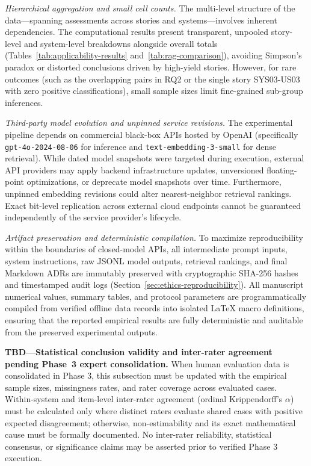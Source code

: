 \emph{Hierarchical aggregation and small cell counts.}
The multi-level structure of the data---spanning \StudyAssessmentCount{}
assessments across \StudyStoryCount{} stories and \StudySystemCount{} systems---involves
inherent dependencies. The computational results present transparent, unpooled
story-level and system-level breakdowns alongside overall totals
(Tables~\ref{tab:applicability-results} and~\ref{tab:rag-comparison}),
avoiding Simpson's paradox or distorted conclusions driven by high-yield stories.
However, for rare outcomes (such as the \StudyRagOverlapCount{} overlapping
pairs in RQ2 or the single story SYS03-US03 with zero positive classifications),
small sample sizes limit fine-grained sub-group inferences.

\emph{Third-party model evolution and unpinned service revisions.}
The experimental pipeline depends on commercial black-box APIs hosted by
OpenAI (specifically \texttt{gpt-4o-2024-08-06} for inference and
\texttt{text-embedding-3-small} for dense retrieval).
While dated model snapshots were targeted during execution, external API
providers may apply backend infrastructure updates, unversioned floating-point
optimizations, or deprecate model snapshots over time.
Furthermore, unpinned embedding revisions could alter nearest-neighbor
retrieval rankings. Exact bit-level replication across external cloud
endpoints cannot be guaranteed independently of the service provider's lifecycle.

\emph{Artifact preservation and deterministic compilation.}
To maximize reproducibility within the boundaries of closed-model APIs, all
intermediate prompt inputs, system instructions, raw JSONL model outputs,
retrieval rankings, and final Markdown ADRs are immutably preserved with
cryptographic SHA-256 hashes and timestamped audit logs (Section~\ref{sec:ethics-reproducibility}).
All manuscript numerical values, summary tables, and protocol parameters
are programmatically compiled from verified offline data records into isolated
LaTeX macro definitions, ensuring that the reported empirical results are
fully deterministic and auditable from the preserved experimental outputs.

\noindent\textbf{TBD---Statistical conclusion validity and inter-rater agreement
pending Phase~3 expert consolidation.} When human evaluation data is
consolidated in Phase 3, this subsection must be updated with the empirical
sample sizes, missingness rates, and rater coverage across evaluated cases.
Within-system and item-level inter-rater agreement (ordinal Krippendorff's
$\alpha$) must be calculated only where distinct raters evaluate shared cases
with positive expected disagreement; otherwise, non-estimability and its exact
mathematical cause must be formally documented. No inter-rater reliability,
statistical consensus, or significance claims may be asserted prior to verified
Phase 3 execution.


